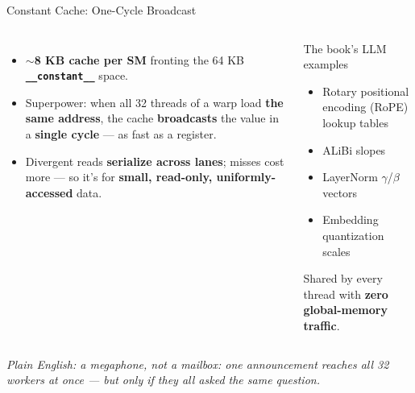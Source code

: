 \documentclass[aspectratio=169]{beamer}
\newcommand{\kw}[1]{\textbf{\textcolor{kwblue}{#1}}}
\newcommand{\pe}[1]{{\footnotesize\itshape Plain English: #1}}
\begin{document}
\begin{frame}{Constant Cache: One-Cycle Broadcast}
  \begin{columns}[t]
    \begin{itemize}
      \item $\sim$\kw{8 KB cache per SM} fronting the 64 KB \kw{\texttt{\_\_constant\_\_}} space.
      \item Superpower: when all 32 threads of a warp load \kw{the same address},
            the cache \kw{broadcasts} the value in a \kw{single cycle} --- as fast as a register.
      \item Divergent reads \kw{serialize across lanes}; misses cost more --- so it's for
            \kw{small, read-only, uniformly-accessed} data.
    \end{itemize}
    \begin{exampleblock}{The book's LLM examples}
      \begin{itemize}\small
        \item Rotary positional encoding (RoPE) lookup tables
        \item ALiBi slopes
        \item LayerNorm $\gamma$/$\beta$ vectors
        \item Embedding quantization scales
      \end{itemize}
      \smallskip
      {\small Shared by every thread with \kw{zero global-memory traffic}.}
    \end{exampleblock}
  \end{columns}
  \medskip
  \pe{a megaphone, not a mailbox: one announcement reaches all 32 workers at once --- but only if they all asked the same question.}
\end{frame}
\end{document}
